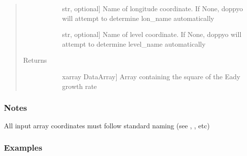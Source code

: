 \documentclass[letterpaper,10pt,english]{sphinxmanual}
\begin{document}
\begin{fulllineitems}
\begin{quote}
\begin{description}
\begin{description}
\item[{}] \leavevmode{[}str, optional{]}
Name of longitude coordinate. If None, doppyo will attempt to determine lon\_name                     automatically

\item[{}] \leavevmode{[}str, optional{]}
Name of level coordinate. If None, doppyo will attempt to determine level\_name
automatically

\end{description}

\item[{Returns}] \leavevmode\begin{description}
\item[{}] \leavevmode{[}xarray DataArray{]}
Array containing the square of the Eady growth rate

\end{description}

\end{description}\end{quote}
\subsubsection*{Notes}

All input array coordinates must follow standard naming (see ,                 , etc)
\subsubsection*{Examples}


\end{fulllineitems}
\end{document}
